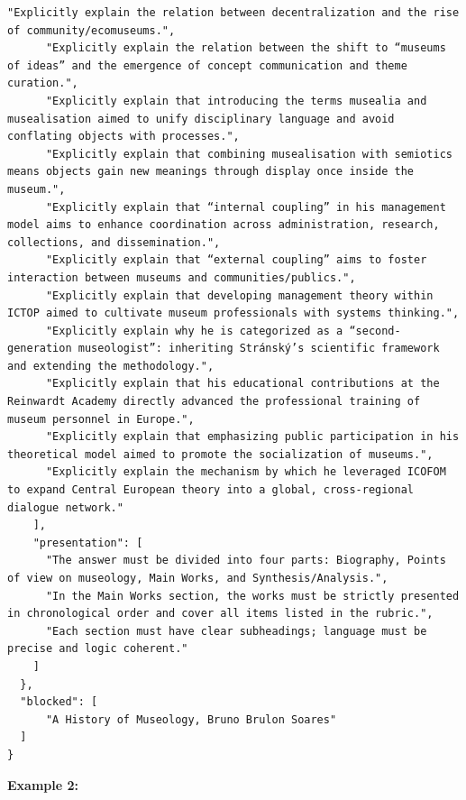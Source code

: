 \documentclass[11pt]{article}
\begin{document}
\begin{tcolorbox}[
  breakable,
  colback=porcelain,
  colframe=gray!75!black,
  left=6pt, right=6pt, top=6pt, bottom=6pt,
  fontupper=\small
]
\begin{lstlisting}[basicstyle=\ttfamily\footnotesize, breaklines=true, frame=none, numbers=none]
      "Explicitly explain the relation between decentralization and the rise of community/ecomuseums.",
      "Explicitly explain the relation between the shift to “museums of ideas” and the emergence of concept communication and theme curation.",
      "Explicitly explain that introducing the terms musealia and musealisation aimed to unify disciplinary language and avoid conflating objects with processes.",
      "Explicitly explain that combining musealisation with semiotics means objects gain new meanings through display once inside the museum.",
      "Explicitly explain that “internal coupling” in his management model aims to enhance coordination across administration, research, collections, and dissemination.",
      "Explicitly explain that “external coupling” aims to foster interaction between museums and communities/publics.",
      "Explicitly explain that developing management theory within ICTOP aimed to cultivate museum professionals with systems thinking.",
      "Explicitly explain why he is categorized as a “second-generation museologist”: inheriting Stránský’s scientific framework and extending the methodology.",
      "Explicitly explain that his educational contributions at the Reinwardt Academy directly advanced the professional training of museum personnel in Europe.",
      "Explicitly explain that emphasizing public participation in his theoretical model aimed to promote the socialization of museums.",
      "Explicitly explain the mechanism by which he leveraged ICOFOM to expand Central European theory into a global, cross-regional dialogue network."
    ],
    "presentation": [
      "The answer must be divided into four parts: Biography, Points of view on museology, Main Works, and Synthesis/Analysis.",
      "In the Main Works section, the works must be strictly presented in chronological order and cover all items listed in the rubric.",
      "Each section must have clear subheadings; language must be precise and logic coherent."
    ]
  },
  "blocked": [
      "A History of Museology, Bruno Brulon Soares"
  ]
}
\end{lstlisting}

\textbf{Example 2:}


\end{tcolorbox}
\end{document}
